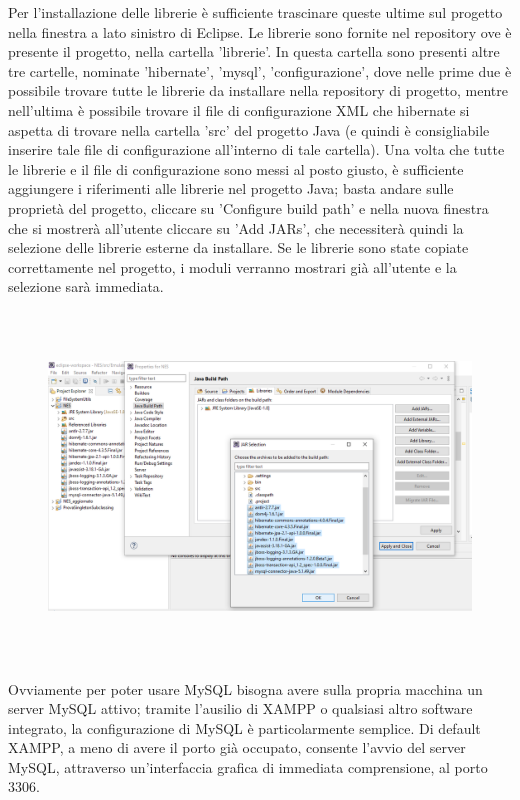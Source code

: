 \documentclass[11pt]{article}
\begin{document}
Per l'installazione delle librerie è sufficiente trascinare queste ultime sul progetto nella finestra a lato sinistro di Eclipse. Le librerie sono fornite nel repository ove è presente il progetto, nella cartella 'librerie'. In questa cartella sono presenti altre tre cartelle, nominate 'hibernate', 'mysql', 'configurazione', dove nelle prime due è possibile trovare tutte le librerie da installare nella repository di progetto, mentre nell'ultima è possibile trovare il file di configurazione XML che hibernate si aspetta di trovare nella cartella 'src' del progetto Java (e quindi è consigliabile inserire tale file di configurazione all'interno di tale cartella).\clearpage
Una volta che tutte le librerie e il file di configurazione sono messi al posto giusto, è sufficiente aggiungere i riferimenti alle librerie nel progetto Java; basta andare sulle proprietà del progetto, cliccare su 'Configure build path' e nella nuova finestra che si mostrerà all'utente cliccare su 'Add JARs', che necessiterà quindi la selezione delle librerie esterne da installare. Se le librerie sono state copiate correttamente nel progetto, i moduli verranno mostrari già all'utente e la selezione sarà immediata.
\begin{figure}[h]
\hspace*{-4.2cm}
\centering
\includegraphics[width=600px ,height=350px]{CONFG.png}
\end{figure}\clearpage
Ovviamente per poter usare MySQL bisogna avere sulla propria macchina un server MySQL attivo; tramite l'ausilio di XAMPP o qualsiasi altro software integrato, la configurazione di MySQL è particolarmente semplice. Di default XAMPP, a meno di avere il porto già occupato, consente l'avvio del server MySQL, attraverso un'interfaccia grafica di immediata comprensione, al porto 3306.
\end{document}
